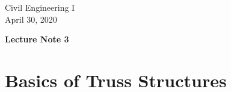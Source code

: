 \documentclass[10pt,a4j]{article}
\newlength{\minitwocolumn}
\begin{document}
\newcommand{\fat}[1]{\mbox{\boldmath $#1$}}
\newcommand{\D}{\partial}
\newcommand{\w}{\omega}
\newcommand{\ga}{\alpha}
\newcommand{\gb}{\beta}
\newcommand{\gx}{\xi}
\newcommand{\gz}{\zeta}
\newcommand{\vhat}[1]{\hat{\fat{#1}}}
\newcommand{\spc}{\vspace{0.7\baselineskip}}
\newcommand{\halfspc}{\vspace{0.3\baselineskip}}

\newcommand{\twofig}[2]
 {
   \begin{figure}
     \begin{minipage}[t]{\minitwocolumn}
         \begin{center}   #1
         \end{center}
     \end{minipage}
         \hspace{\columnsep}
     \begin{minipage}[t]{\minitwocolumn}
         \begin{center} #2
         \end{center}
     \end{minipage}
   \end{figure}
 }
\begin{flushright}
	Civil Engineering I \\
	April 30, 2020
\end{flushright}
\begin{center}
	{\Large \bf Lecture Note 3 }
\end{center}
\setcounter{section}{2}
\section{Basics of Truss Structures}
\end{document}
